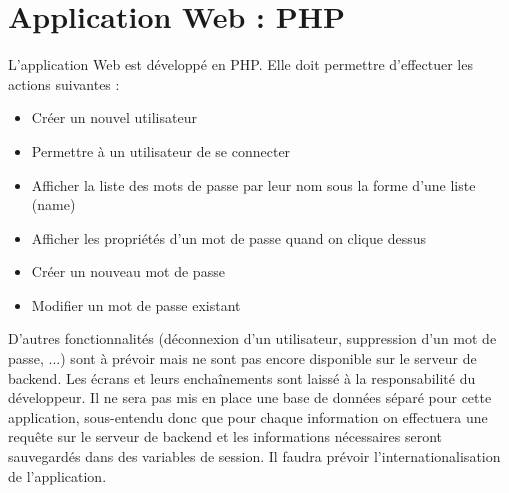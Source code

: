 \documentclass[12pt]{report}
\begin{document}
	\chapter{Application Web : PHP}
	L'application Web est développé en PHP. Elle doit permettre d'effectuer les actions suivantes :
	\begin{itemize}
		\item Créer un nouvel utilisateur
		\item Permettre à un utilisateur de se connecter
		\item Afficher la liste des mots de passe par leur nom sous la forme d'une liste (name)
		\item Afficher les propriétés d'un mot de passe quand on clique dessus
		\item Créer un nouveau mot de passe
		\item Modifier un mot de passe existant
	\end{itemize}
	D'autres fonctionnalités (déconnexion d'un utilisateur, suppression d'un mot de passe, ...) sont à prévoir mais ne sont pas encore disponible sur le serveur de backend.
	\newline
	Les écrans et leurs enchaînements sont laissé à la responsabilité du développeur.
	\newline
	Il ne sera pas mis en place une base de données séparé pour cette application, sous-entendu donc que pour chaque information on effectuera une requête sur le serveur de backend et les informations nécessaires seront sauvegardés dans des variables de session.
	\newline
	Il faudra prévoir l'internationalisation de l'application.
\end{document}
